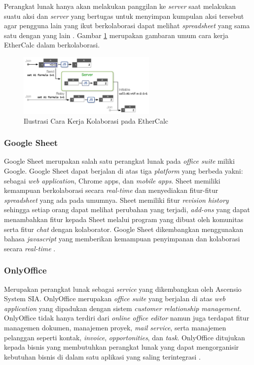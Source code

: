 Perangkat lunak hanya akan melakukan panggilan ke \textit{server} saat melakukan suatu aksi dan \textit{server} yang bertugas untuk menyimpan kumpulan aksi tersebut agar pengguna lain yang ikut berkolaborasi dapat melihat \textit{spreadsheet} yang sama satu dengan yang lain \citep{EtherCalc}. Gambar \ref{IlustrasiEtherCalc} merupakan gambaran umum cara kerja EtherCalc dalam berkolaborasi.

\begin{figure}[htb]
    \centering
    \includegraphics[width=0.6\textwidth]{resources/chapter-2-ethercalc.png}
    \caption{Ilustrasi Cara Kerja Kolaborasi pada EtherCalc}
    \label{IlustrasiEtherCalc}
\end{figure}

\subsubsection{Google Sheet}
Google Sheet merupakan salah satu perangkat lunak pada \textit{office suite} miliki Google. Google Sheet dapat berjalan di atas tiga \textit{platform} yang berbeda yakni: sebagai \textit{web application}, Chrome apps, dan \textit{mobile apps}. Sheet memiliki kemampuan berkolaborasi secara \textit{real-time} dan menyediakan fitur-fitur \textit{spreadsheet} yang ada pada umumnya. Sheet memiliki fitur \textit{revision history} sehingga setiap orang dapat melihat perubahan yang terjadi, \textit{add-ons} yang dapat menambahkan fitur kepada Sheet melalui program yang dibuat oleh komunitas serta fitur \textit{chat} dengan kolaborator. Google Sheet dikembangkan menggunakan bahasa \textit{javascript} yang memberikan kemampuan penyimpanan dan kolaborasi secara \textit{real-time} \citep{GoogleSheet}.

\subsubsection{OnlyOffice}
Merupakan perangkat lunak sebagai \textit{\textit{service}} yang dikembangkan oleh Ascensio System SIA. OnlyOffice merupakan \textit{office suite} yang berjalan di atas \textit{web application} yang dipadukan dengan sistem \textit{customer relationship management}. OnlyOffice tidak hanya terdiri dari \textit{online office editor} namun juga terdapat fitur managemen dokumen, manajemen proyek, \textit{mail service}, serta manajemen pelanggan seperti kontak, \textit{invoice}, \textit{opportonities}, dan \textit{task}. OnlyOffice ditujukan kepada bisnis yang membutuhkan perangkat lunak yang dapat mengorganisir kebutuhan bisnis di dalam satu aplikasi yang saling terintegrasi \citep{OnlyOffice}.


